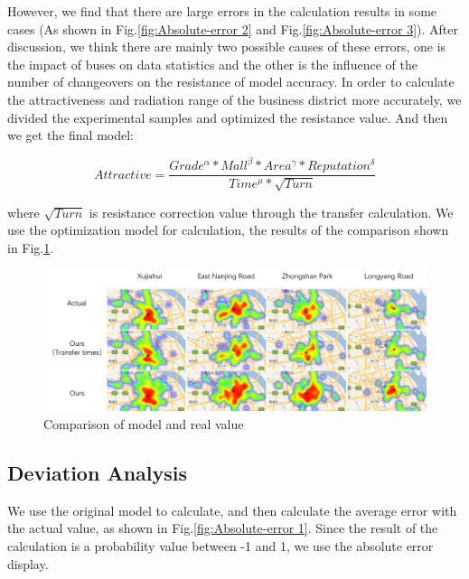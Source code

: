 \documentclass[journal]{IEEEtran}
\begin{document}
However, we find that there are large errors in the calculation results in some cases (As shown in Fig.\ref{fig:Absolute-error 2} and Fig.\ref{fig:Absolute-error 3}). After discussion, we think there are mainly two possible causes of these errors, one is the impact of buses on data statistics and the other is the influence of the number of changeovers on the resistance of model accuracy. In order to calculate the attractiveness and radiation range of the business district more accurately, we divided the experimental samples and optimized the resistance value. And then we get the final model:

\begin{equation}
Attractive=\frac{Grade^{\alpha}*Mall^{\beta}*Area^{\gamma}*Reputation^{\delta}}{Time^{\mu}*\sqrt{Turn}}
\end{equation}

where $\sqrt{Turn}$ is resistance correction value through the transfer calculation. We use the optimization model for calculation, the results of the comparison shown in Fig.\ref{fig:Comparison-real-value}. 

\begin{figure}[tb]
\centering
\includegraphics[width=1\columnwidth]{figure9.png}
\caption{Comparison of model and real value}
\label{fig:Comparison-real-value}
\end{figure}















\subsection{Deviation Analysis}

We use the original model to calculate, and then calculate the average error with the actual value, as shown in Fig.\ref{fig:Absolute-error 1}. Since the result of the calculation is a probability value between -1 and 1, we use the absolute error display.
\end{document}
